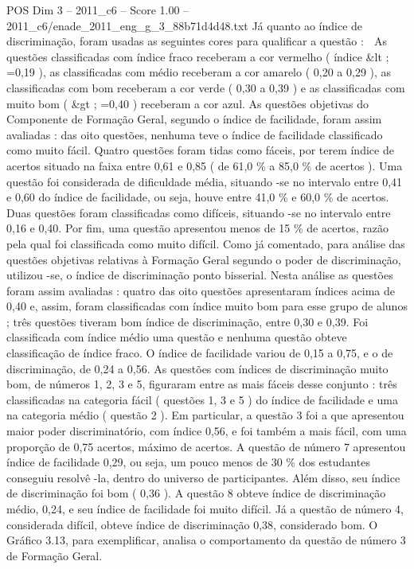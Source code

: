 \begin{textsample}{POS Dim 3 – 2011\_c6 – Score 1.00 – 2011\_c6/enade\_2011\_eng\_g\_3\_88b71d4d48.txt}
Já quanto ao índice de discriminação, foram usadas as seguintes cores para qualificar a questão :  As questões classificadas com índice fraco receberam a cor vermelho ( índice \&lt ; =0,19 ), as classificadas com médio receberam a cor amarelo ( 0,20 a 0,29 ), as classificadas com bom receberam a cor verde ( 0,30 a 0,39 ) e as classificadas com muito bom ( \&gt ; =0,40 ) receberam a cor azul.
As questões objetivas do Componente de Formação Geral, segundo o índice de facilidade, foram assim avaliadas : das oito questões, nenhuma teve o índice de facilidade classificado como muito fácil.
Quatro questões foram tidas como fáceis, por terem índice de acertos situado na faixa entre 0,61 e 0,85 ( de 61,0 \% a 85,0 \% de acertos ).
Uma questão foi considerada de dificuldade média, situando -se no intervalo entre 0,41 e 0,60 do índice de facilidade, ou seja, houve entre 41,0 \% e 60,0 \% de acertos.
Duas questões foram classificadas como difíceis, situando -se no intervalo entre 0,16 e 0,40.
Por fim, uma questão apresentou menos de 15 \% de acertos, razão pela qual foi classificada como muito difícil.
Como já comentado, para análise das questões objetivas relativas à Formação Geral segundo o poder de discriminação, utilizou -se, o índice de discriminação ponto bisserial.
Nesta análise as questões foram assim avaliadas : quatro das oito questões apresentaram índices acima de 0,40 e, assim, foram classificadas com índice muito bom para esse grupo de alunos ; três questões tiveram bom índice de discriminação, entre 0,30 e 0,39.
Foi classificada com índice médio uma questão e nenhuma questão obteve classificação de índice fraco.
O índice de facilidade variou de 0,15 a 0,75, e o de discriminação, de 0,24 a 0,56.
As questões com índices de discriminação muito bom, de números 1, 2, 3 e 5, figuraram entre as mais fáceis desse conjunto : três classificadas na categoria fácil ( questões 1, 3 e 5 ) do índice de facilidade e uma na categoria médio ( questão 2 ).
Em particular, a questão 3 foi a que apresentou maior poder discriminatório, com índice 0,56, e foi também a mais fácil, com uma proporção de 0,75 acertos, máximo de acertos.
A questão de número 7 apresentou índice de facilidade 0,29, ou seja, um pouco menos de 30 \% dos estudantes conseguiu resolvê -la, dentro do universo de participantes.
Além disso, seu índice de discriminação foi bom ( 0,36 ).
A questão 8 obteve índice de discriminação médio, 0,24, e seu índice de facilidade foi muito difícil.
Já a questão de número 4, considerada difícil, obteve índice de discriminação 0,38, considerado bom.
O Gráfico 3.13, para exemplificar, analisa o comportamento da questão de número 3 de Formação Geral.

\end{textsample}
